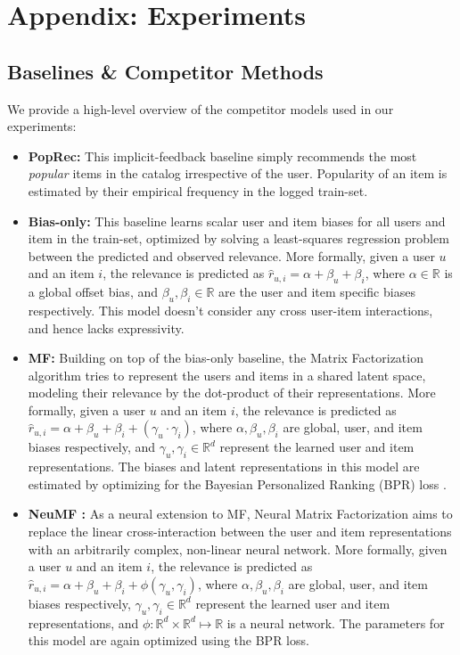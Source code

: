\documentclass{article}
\begin{document}
\section{Appendix: Experiments} \label{appendix:experiments}

\subsection{Baselines \& Competitor Methods} \label{appendix:competitors}

We provide a high-level overview of the competitor models used in our experiments:


\begin{itemize}[leftmargin=.3in]
    \item \textbf{PopRec:} This implicit-feedback baseline simply recommends the most \emph{popular} items in the catalog irrespective of the user. Popularity of an item is estimated by their empirical frequency in the logged train-set.
    
    \item \textbf{Bias-only:} This baseline learns scalar user and item biases for all users and item in the train-set, optimized by solving a least-squares regression problem between the predicted and observed relevance. More formally, given a user $u$ and an item $i$, the relevance is predicted as $\hat{r}_{u, i} = \alpha + \beta_u + \beta_i$, where $\alpha \in \mathbb{R}$ is a global offset bias, and $\beta_u, \beta_i \in \mathbb{R}$ are the user and item specific biases respectively. This model doesn't consider any cross user-item interactions, and hence lacks expressivity.
    
    \item \textbf{MF:} Building on top of the bias-only baseline, the Matrix Factorization algorithm tries to represent the users and items in a shared latent space, modeling their relevance by the dot-product of their representations. More formally, given a user $u$ and an item $i$, the relevance is predicted as $\hat{r}_{u, i} = \alpha + \beta_u + \beta_i + (\gamma_u \cdot \gamma_i)$, where $\alpha, \beta_u, \beta_i$ are global, user, and item biases respectively, and $\gamma_u, \gamma_i \in \mathbb{R}^d$ represent the learned user and item representations. The biases and latent representations in this model are estimated by optimizing for the Bayesian Personalized Ranking (BPR) loss \cite{bpr}.
    
    \item \textbf{NeuMF \cite{neural_mf}:} As a neural extension to MF, Neural Matrix Factorization aims to replace the linear cross-interaction between the user and item representations with an arbitrarily complex, non-linear neural network. More formally, given a user $u$ and an item $i$, the relevance is predicted as $\hat{r}_{u, i} = \alpha + \beta_u + \beta_i + \phi(\gamma_u, \gamma_i)$, where $\alpha, \beta_u, \beta_i$ are global, user, and item biases respectively, $\gamma_u, \gamma_i \in \mathbb{R}^d$ represent the learned user and item representations, and $\phi : \mathbb{R}^d \times \mathbb{R}^d \mapsto \mathbb{R}$ is a neural network. The parameters for this model are again optimized using the BPR loss.
    

\end{itemize}
\end{document}

